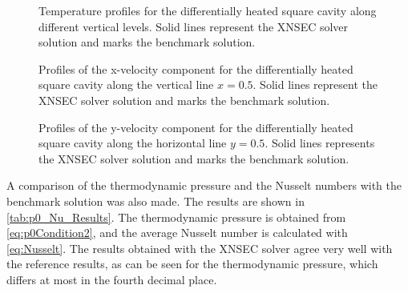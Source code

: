 \begin{figure}[h]
	\centering
	\pgfplotsset{width=0.22\textwidth, compat=1.3} 
	\caption[Temperature profiles for the differentially heated square cavity along different vertical levels.]{Temperature profiles for the differentially heated square cavity along different vertical levels. Solid lines represent the XNSEC solver solution and marks the benchmark solution.}
	\label{fig:TempProfile}
\end{figure}
\begin{figure}[h]
	\centering
	\pgfplotsset{width=0.22\textwidth, compat=1.3}
	\caption[Profiles of the x-velocity component for the differentially heated square cavity along the vertical line $x=0.5$.]{Profiles of the x-velocity component for the differentially heated square cavity along the vertical line $x=0.5$. Solid lines represent the XNSEC solver solution and marks the benchmark solution.}
	\label{fig:VelocityXProfile}
\end{figure}%
%
\begin{figure}[h]
	\centering
	\pgfplotsset{width=0.22\textwidth, compat=1.3}
	\caption[Profiles of the y-velocity component for the differentially heated square cavity along the horizontal line $y=0.5$.]{Profiles of the y-velocity component for the differentially heated square cavity along the horizontal line $y=0.5$. Solid lines represents the XNSEC solver solution and marks the benchmark solution.}
	\label{fig:VelocityYProfile}
\end{figure}
\FloatBarrier
A comparison of the thermodynamic pressure and the Nusselt numbers with the benchmark solution was also made. The results are shown in \cref{tab:p0_Nu_Results}.  The thermodynamic pressure is obtained from \cref{eq:p0Condition2}, and the average Nusselt number is calculated with \cref{eq:Nusselt}. The results obtained with the XNSEC solver agree very well with the reference results, as can be seen for the thermodynamic pressure, which differs at most in the fourth decimal place. 

